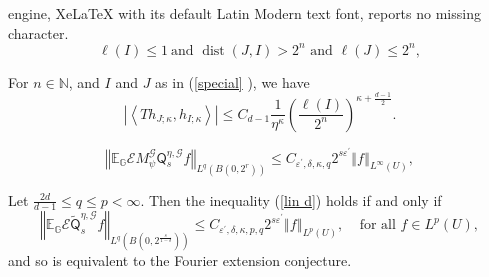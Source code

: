 \documentclass[10pt,a4paper]{amsart}
\begin{document}
engine, XeLaTeX with its default Latin Modern text font, reports no missing character.
\begin{equation}
\ell\left(  I\right)  \leq1\ \text{and }\operatorname*{dist}\left(
J,I\right)  >2^{n}\text{ and }\ell\left(  J\right)  \leq2^{n},\label{special}%
\end{equation}

\begin{lemma}
\label{lem special}For $n\in\mathbb{N}$, and $I$ and $J$ as in (\ref{special}%
), we have%
\[
\left\vert \left\langle Th_{J;\kappa},h_{I;\kappa}\right\rangle \right\vert
\leq C_{d-1}\frac{1}{\eta^{\kappa}}\left(  \frac{\ell\left(  I\right)  }%
{2^{n}}\right)  ^{\kappa+\frac{d-1}{2}}.
\]

\end{lemma}

\begin{equation}
\left\Vert \mathbb{E}_{\mathbb{G}}\mathcal{E}M_{\psi}^{\mathcal{G}}%
\mathsf{Q}_{s}^{\eta,\mathcal{G}}f\right\Vert _{L^{q}\left(  B\left(
0,2^{r}\right)  \right)  }\leq C_{\varepsilon^{\prime},\delta,\kappa
,q}2^{s\varepsilon^{\prime}}\left\Vert f\right\Vert _{L^{\infty}\left(
U\right)  },\label{lin d}%
\end{equation}

\begin{corollary}
\label{Cor LSST}Let $\frac{2d}{d-1}\leq q\leq p<\infty$. Then the inequality
(\ref{lin d}) holds if and only if%
\begin{equation}
\left\Vert \mathbb{E}_{\mathbb{G}}\mathcal{E}\widetilde{\mathsf{Q}}_{s}%
^{\eta,\mathcal{G}}f\right\Vert _{L^{q}\left(  B\left(  0,2^{\frac{s}%
{1-\delta}}\right)  \right)  }\leq C_{\varepsilon^{\prime},\delta,\kappa
,p,q}2^{s\varepsilon^{\prime}}\left\Vert f\right\Vert _{L^{p}\left(  U\right)
},\ \ \ \ \ \text{for all }f\in L^{p}\left(  U\right)  ,\label{lin d'}%
\end{equation}
and so is equivalent to the Fourier extension conjecture.
\end{corollary}
\end{document}
